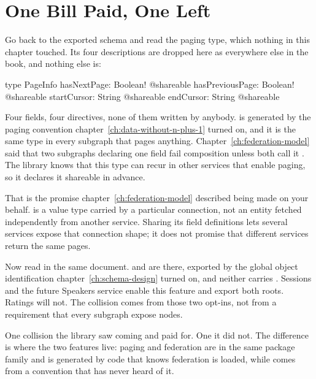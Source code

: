 \section{One Bill Paid, One Left}
\label{sec:ch06-one-bill-paid-one-left}

%
Go back to the exported schema and read the paging type, which nothing in this
chapter touched. Its four descriptions are dropped here as everywhere else in
the book, and nothing else is:

\begin{graphqlsdl}
type PageInfo {
  hasNextPage: Boolean! @shareable
  hasPreviousPage: Boolean! @shareable
  startCursor: String @shareable
  endCursor: String @shareable
}
\end{graphqlsdl}

%
Four fields, four directives, none of them written by anybody. 
is generated by the paging convention chapter~\ref{ch:data-without-n-plus-1}
turned on, and it is the same type in every subgraph that pages anything.
Chapter~\ref{ch:federation-model} said that two subgraphs declaring one field
fail composition unless both call it . The library knows that
this type can recur in other services that enable paging, so it declares
it shareable in advance.

%
That is the promise chapter~\ref{ch:federation-model} described being made on
your behalf.  is a value type carried by a particular
connection, not an entity fetched independently from another service.
Sharing its field definitions lets several services expose that connection
shape; it does not promise that different services return the same pages.

%
Now read  in the same document.  and  are
there, exported by the global object identification
chapter~\ref{ch:schema-design} turned on, and neither carries
. Sessions and the future Speakers service enable this
feature and export both roots. Ratings will not. The collision comes from
those two opt-ins, not from a requirement that every subgraph expose nodes.

%
One collision the library saw coming and paid for. One it did not. The
difference is where the two features live: paging and federation are in the same
package family and  is generated by code that knows federation is
loaded, while  comes from a convention that has never heard of it.

